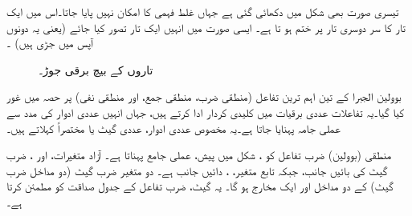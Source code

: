  تیسری صورت بھی شکل میں دکھائی گئی ہے جہاں غلط فہمی کا امکان نہیں پایا جاتا۔اس میں ایک تار کا سر دوسری تار پر ختم ہو تا ہے۔ ایسی صورت میں انہیں ایک تار تصور کیا جائے (یعنی یہ دونوں آپس میں جڑی ہیں) ۔
\begin{figure}
\centering
{}\quad\quad
{}\quad \quad 
{}
\caption{تاروں کے بیچ برقی جوڑ۔}
\label{شکل_بوولین_برقی_تار_جوڑ}
\end{figure}


 بوولین الجبرا کے تین اہم ترین تفاعل (منطقی ضرب، منطقی جمع، اور منطقی نفی)  پر حصہ  میں غور کیا گیا۔یہ تفاعلات عددی برقیات میں کلیدی کردار ادا کرتے ہیں، جہاں انہیں عددی ادوار کی مدد سے عملی  جامہ پہنایا جاتا ہے۔یہ مخصوص عددی ادوار، عددی گیٹ یا مختصراً  کہلاتے ہیں۔


منطقی (بوولین) ضرب تفاعل کو    ، شکل  میں پیش،   عملی جامع پہناتا  ہے۔  آزاد متغیرات،  اور ، ضرب گیٹ کی بائیں جانب،  جبکہ تابع متغیر، ، دائیں جانب ہے۔   دو متغیر ضرب گیٹ (دو مداخل ضرب گیٹ) کے دو مداخل اور ایک مخارج ہو گا۔ یہ گیٹ، ضرب تفاعل کے جدول  صداقت کو مطمئن کرتا ہے۔


